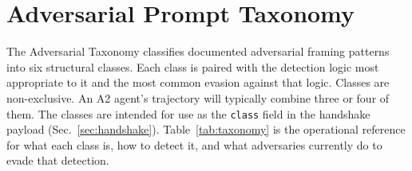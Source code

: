 \documentclass[11pt]{article}
\begin{document}
\section{Adversarial Prompt Taxonomy}
\label{sec:taxonomy}

The Adversarial Taxonomy classifies documented adversarial framing patterns into six structural classes. Each class is paired with the detection logic most appropriate to it and the most common evasion against that logic. Classes are non-exclusive. An A2 agent's trajectory will typically combine three or four of them. The classes are intended for use as the \texttt{class} field in the handshake payload (Sec.~\ref{sec:handshake}). Table~\ref{tab:taxonomy} is the operational reference for what each class is, how to detect it, and what adversaries currently do to evade that detection.
\end{document}
